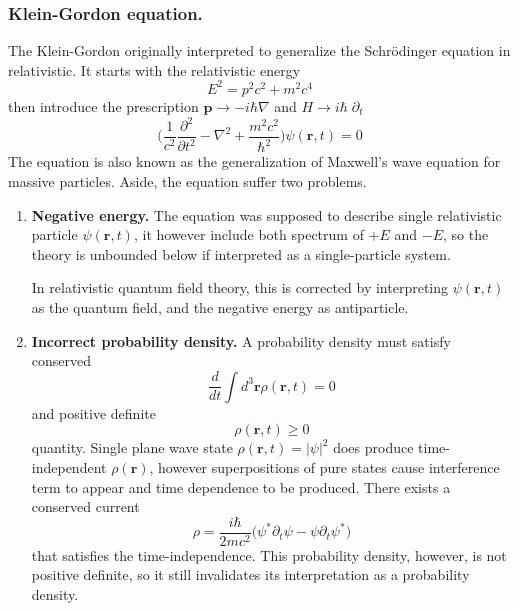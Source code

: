 \documentclass[../../../main.tex]{subfiles}
\begin{document}
\subsubsection{Klein-Gordon equation.}
The Klein-Gordon originally interpreted to generalize the Schrödinger equation in relativistic.
It starts with the relativistic energy
\begin{equation*}
    E^2 = p^2c^2+ m^2c^4
\end{equation*}
then introduce the prescription $    \mathbf{p} \to -i\hbar\nabla $ and  $    H \to i\hbar \;\partial_t$
\begin{equation*}
    \bigg(\frac{1}{c^2}\frac{\partial^2}{\partial t^2} - \nabla^2 + \frac{m^2 c^2}{\hbar^2}\bigg)\psi(\mathbf r,t) = 0
\end{equation*}
The equation is also known as the generalization of Maxwell’s wave equation for massive particles.
Aside, the equation suffer two problems.
\begin{enumerate}
    \item \textbf{Negative energy.}
          The equation was supposed to describe single relativistic particle $\psi(\mathbf{r},t)$, it however include both spectrum of $+E$ and $-E$, so the theory is unbounded below if interpreted as a single-particle system.

          In relativistic quantum field theory, this is corrected by interpreting $\psi(\mathbf{r},t)$ as the quantum field, and the negative energy as antiparticle.
    \item \textbf{Incorrect probability density.}
          A probability density must satisfy conserved
          \begin{equation*}
              \frac{d }{dt } \int d^3 \mathbf{r} \rho(\mathbf{r},t) = 0
          \end{equation*}
          and positive definite
          \begin{equation*}
              \rho(\mathbf{r},t) \geq  0
          \end{equation*}
          quantity.
          Single plane wave state $\rho(\mathbf{r},t) = |\psi|^2$ does produce time-independent $\rho(\mathbf{r})$, however superpositions of pure states cause interference term to appear and time dependence to be produced.
          There exists a conserved current
          \begin{equation*}
              \rho = \frac{i\hbar}{2 m c^{2}}\bigl(\psi^{*}\partial_{t}\psi - \psi\partial_{t}\psi^{*}\bigr)
          \end{equation*}
          that satisfies the time-independence.
          This probability density, however, is not positive definite, so it still invalidates its interpretation as a probability density.
\end{enumerate}
\end{document}
